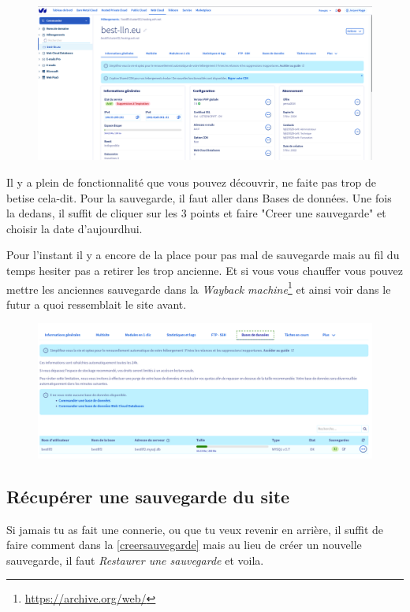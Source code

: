 \documentclass[12pt]{article}
\begin{document}
		\vfill
		
		\begin{figure}[htp]
			\centering
			\includegraphics[width=.8\textwidth]{img/OVH1.png}
		\end{figure}
		
		Il y a plein de fonctionnalité que vous pouvez découvrir, ne faite pas trop de betise cela-dit. Pour la sauvegarde, il faut aller dans Bases de données. Une fois la dedans, il suffit de cliquer sur les 3 points et faire "Creer une sauvegarde" et choisir la date d'aujourdhui.
		
		Pour l'instant il y a encore de la place pour pas mal de sauvegarde mais au fil du temps hesiter pas a retirer les trop ancienne. Et si vous vous chauffer vous pouvez mettre les anciennes sauvegarde dans la \textit{Wayback machine}\footnote{\url{https://archive.org/web/}} et ainsi voir dans le futur a quoi ressemblait le site avant.
		
		\begin{figure}[htp]
			\centering
			\includegraphics[width=.8\textwidth]{img/OVH2.png}
		\end{figure}
		
	
	\subsection{Récupérer une sauvegarde du site}
		Si jamais tu as fait une connerie, ou que tu veux revenir en arrière, il suffit de faire comment dans la \autoref{creersauvegarde} mais au lieu de créer un nouvelle sauvegarde, il faut \textit{Restaurer une sauvegarde} et voila.
		
\end{document}
